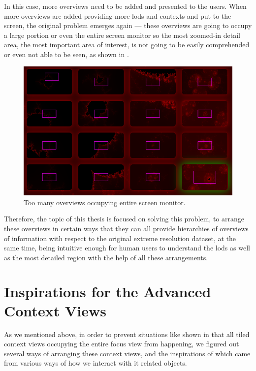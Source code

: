 In this case, more overviews need to be added and presented to the users. When more overviews are added providing more \glspl{lod} and contexts and put to the screen, the original problem emerges again --- these overviews are going to occupy a large portion or even the entire screen monitor so the most zoomed-in detail area, the most important area of interest, is not going to be easily comprehended or even not able to be seen, as shown in . 

\begin{figure}[H]
\centering
\includegraphics[width=\textwidth,keepaspectratio]{Figures/Chapter1/occupiesscreen.png}
\decoRule
\caption[Occupied Screen]{Too many overviews occupying entire screen monitor.}
\label{fig:occupiesscreen}
\end{figure}

Therefore, the topic of this thesis is focused on solving this problem, to arrange these overviews in certain ways that they can all provide hierarchies of overviews of information with respect to the original extreme resolution dataset, at the same time, being intuitive enough for human users to understand the \glspl{lod} as well as the most detailed region with the help of all these arrangements.

\section{Inspirations for the Advanced Context Views}


As we mentioned above, in order to prevent situations like shown in  that all tiled context views occupying the entire focus view from happening, we figured out several ways of arranging these context views, and the inspirations of which came from various ways of how we interact with \gls{it} related objects.

